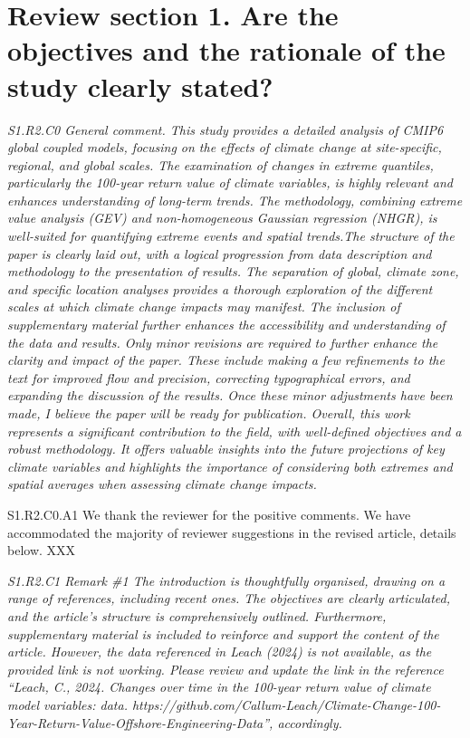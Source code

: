 \documentclass[a4paper,10pt]{article}
\begin{document}
	\section*{Review section 1. Are the objectives and the rationale of the study clearly stated?}
	\emph{S1.R2.C0 General comment. This study provides a detailed analysis of CMIP6 global coupled models, focusing on the effects of climate change at site-specific, regional, and global scales. The examination of changes in extreme quantiles, particularly the 100-year return value of climate variables, is highly relevant and enhances understanding of long-term trends. The methodology, combining extreme value analysis (GEV) and non-homogeneous Gaussian regression (NHGR), is well-suited for quantifying extreme events and spatial trends.The structure of the paper is clearly laid out, with a logical progression from data description and methodology to the presentation of results. The separation of global, climate zone, and specific location analyses provides a thorough exploration of the different scales at which climate change impacts may manifest. The inclusion of supplementary material further enhances the accessibility and understanding of the data and results. Only minor revisions are required to further enhance the clarity and impact of the paper. These include making a few refinements to the text for improved flow and precision, correcting typographical errors, and expanding the discussion of the results. Once these minor adjustments have been made, I believe the paper will be ready for publication. Overall, this work represents a significant contribution to the field, with well-defined objectives and a robust methodology. It offers valuable insights into the future projections of key climate variables and highlights the importance of considering both extremes and spatial averages when assessing climate change impacts.}
	
	S1.R2.C0.A1 We thank the reviewer for the positive comments. We have accommodated the majority of reviewer suggestions in the revised article, details below. XXX
		
	\emph{S1.R2.C1 Remark \#1 The introduction is thoughtfully organised, drawing on a range of references, including recent ones. The objectives are clearly articulated, and the article’s structure is comprehensively outlined. Furthermore, supplementary material is included to reinforce and support the content of the article. However, the data referenced in Leach (2024) is not available, as the provided link is not working. Please review and update the link in the reference “Leach, C., 2024. Changes over time in the 100-year return value of climate model variables: data. https://github.com/Callum-Leach/Climate-Change-100-Year-Return-Value-Offshore-Engineering-Data”, accordingly.}
	
\end{document}
